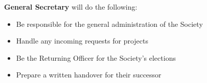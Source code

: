 \begin{subclause}
  \textbf{General Secretary} will do the following:
  \begin{itemize}[label=--]
    \item Be responsible for the general administration of the Society
    \item Handle any incoming requests for projects
    \item Be the Returning Officer for the Society's elections
    \item Prepare a written handover for their successor
  \end{itemize}
\end{subclause}

